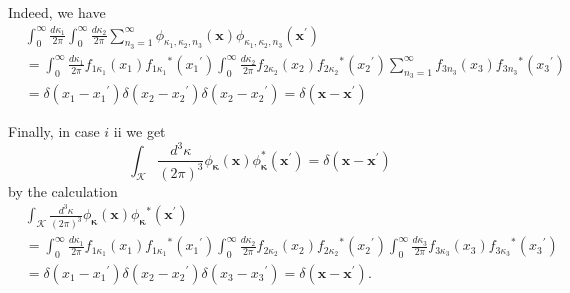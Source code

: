 \documentclass{article}
\begin{document}
Indeed, we have
$$
\begin{align*}
& \int_{0}^{\infty} \frac{d \kappa_{1}}{2 \pi} \int_{0}^{\infty} \frac{d \kappa_{2}}{2 \pi} \sum_{n_{3}=1}^{\infty} \phi_{\kappa_{1}, \kappa_{2}, n_{3}}(\boldsymbol{x}) \phi_{\kappa_{1}, \kappa_{2}, n_{3}}\left(\boldsymbol{x}^{\prime}\right)  \tag{3.15.80}\\
& =\int_{0}^{\infty} \frac{d \kappa_{1}}{2 \pi} f_{1 \kappa_{1}}\left(x_{1}\right) f_{1 \kappa_{1}}{ }^{*}\left(x_{1}{ }^{\prime}\right) \int_{0}^{\infty} \frac{d \kappa_{2}}{2 \pi} f_{2 \kappa_{2}}\left(x_{2}\right) f_{2 \kappa_{2}}{ }^{*}\left(x_{2}{ }^{\prime}\right) \sum_{n_{3}=1}^{\infty} f_{3 n_{3}}\left(x_{3}\right) f_{3 n_{3}}{ }^{*}\left(x_{3}{ }^{\prime}\right) \\
& =\delta\left(x_{1}-x_{1}{ }^{\prime}\right) \delta\left(x_{2}-x_{2}{ }^{\prime}\right) \delta\left(x_{2}-x_{2}{ }^{\prime}\right)=\delta\left(\boldsymbol{x}-\boldsymbol{x}^{\prime}\right)
\end{align*}
$$

Finally, in case $i$ ii we get
$$
\begin{equation*}
\int_{\mathcal{K}} \frac{d^{3} \kappa}{(2 \pi)^{3}} \phi_{\boldsymbol{\kappa}}(\boldsymbol{x}) \phi_{\boldsymbol{\kappa}}^{*}\left(\boldsymbol{x}^{\prime}\right)=\delta\left(\boldsymbol{x}-\boldsymbol{x}^{\prime}\right) \tag{3.15.81}
\end{equation*}
$$
by the calculation
$$
\begin{align*}
& \int_{\mathcal{K}} \frac{d^{3} \kappa}{(2 \pi)^{3}} \phi_{\boldsymbol{\kappa}}(\boldsymbol{x}) \phi_{\boldsymbol{\kappa}}{ }^{*}\left(\boldsymbol{x}^{\prime}\right)  \tag{3.15.82}\\
& =\int_{0}^{\infty} \frac{d \kappa_{1}}{2 \pi} f_{1 \kappa_{1}}\left(x_{1}\right) f_{1 \kappa_{1}}{ }^{*}\left(x_{1}{ }^{\prime}\right) \int_{0}^{\infty} \frac{d \kappa_{2}}{2 \pi} f_{2 \kappa_{2}}\left(x_{2}\right) f_{2 \kappa_{2}}{ }^{*}\left(x_{2}{ }^{\prime}\right) \int_{0}^{\infty} \frac{d \kappa_{3}}{2 \pi} f_{3 \kappa_{3}}\left(x_{3}\right) f_{3 \kappa_{3}}{ }^{*}\left(x_{3}{ }^{\prime}\right) \\
& =\delta\left(x_{1}-x_{1}{ }^{\prime}\right) \delta\left(x_{2}-x_{2}{ }^{\prime}\right) \delta\left(x_{3}-x_{3}{ }^{\prime}\right)=\delta\left(\boldsymbol{x}-\boldsymbol{x}^{\prime}\right) .
\end{align*}
$$
\end{document}
